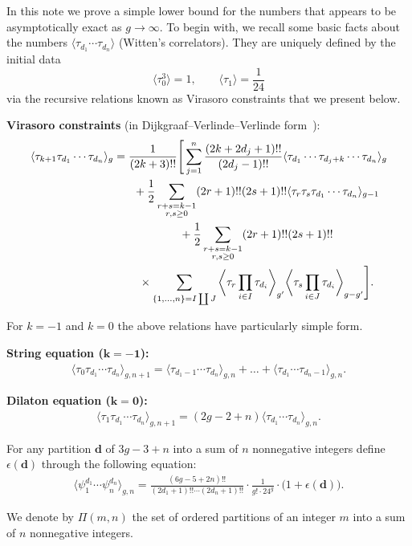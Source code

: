 In this note we prove a simple lower bound for the numbers
that appears to be asymptotically exact as $g\to\infty$. To
begin with, we recall some basic facts about the numbers
$\langle\tau_{d_1}\cdots\tau_{d_n}\rangle$ (Witten's
correlators). They are uniquely defined by the initial data
\[
\big\langle \tau_0^3 \big\rangle = 1,\qquad
\langle \tau_{1} \rangle = \frac{1}{24}
\]
via the recursive relations known as Virasoro constraints that we present below.

\textbf{Virasoro constraints} (in Dijkgraaf--Verlinde--Verlinde form~\cite{Dij, DVV}):
\begin{gather}
\langle\tau_{k+1}\tau_{d_1}\cdots\tau_{d_n}\rangle_g=\frac{1}{(2k+3)!!}\Bigg[\sum_{j=1}^n
\frac{(2k+2d_j+1)!!}{(2d_j-1)!!}\langle\tau_{d_1}\cdots
\tau_{d_{j}+k}\cdots\tau_{d_n}\rangle_g\nonumber\\
\hphantom{\langle\tau_{k+1}\tau_{d_1}\cdots\tau_{d_n}\rangle_g=}{} +\frac{1}{2}\sum_{\substack{r+s=k-1\\r,s\ge 0}}
(2r+1)!!(2s+1)!!\langle\tau_r\tau_s\tau_{d_1}\cdots\tau_{d_n}\rangle_{g-1}\nonumber\\
\hphantom{\langle\tau_{k+1}\tau_{d_1}\cdots\tau_{d_n}\rangle_g=}{} +\frac{1}{2}\sum_{\substack{r+s=k-1\\r,s\ge 0}} (2r+1)!!(2s+1)!!\nonumber\\
\hphantom{\langle\tau_{k+1}\tau_{d_1}\cdots\tau_{d_n}\rangle_g=}{}\times
\sum_{\{1,\dots,n\}=I\coprod J}\bigg\langle\tau_r\prod_{i\in
I}\tau_{d_i}\bigg\rangle_{g'}\bigg\langle\tau_s\prod_{i\in
J}\tau_{d_i}\bigg\rangle_{g-g'}\Bigg].\label{eq:virasoro}
\end{gather}

For $k=-1$ and $k=0$ the above relations have particularly simple form.

\textbf{String equation ($\boldsymbol{k=-1}$):}
\begin{gather}\label{eq:string}
\langle \tau_0\tau_{d_1} \cdots \tau_{d_n}\rangle_{g,n+1}
=\langle \tau_{d_1-1} \cdots \tau_{d_n}\rangle_{g,n}
+\dots
+\langle \tau_{d_1} \cdots \tau_{d_n-1}\rangle_{g,n} .
\end{gather}

\textbf{Dilaton equation ($\boldsymbol{k=0}$):}
\begin{gather*}%
\langle \tau_1\tau_{d_1} \cdots \tau_{d_n}\rangle_{g,n+1}
=(2g-2+n)\langle \tau_{d_1} \cdots \tau_{d_n}\rangle_{g,n} .
\end{gather*}

For any partition $\boldsymbol{d}$ of $3g-3+n$
into a sum of $n$ nonnegative integers define
$\epsilon(\boldsymbol{d})$ through the following equation:
\begin{gather*}%
\big\langle \psi_1^{d_1} \cdots \psi_n^{d_n}\big\rangle_{g,n}
=
\frac{(6g-5+2n)!!}{(2d_1+1)!!\cdots(2d_n+1)!!}
\cdot\frac{1}{g!\cdot 24^g} \cdot\big(1+\epsilon(\boldsymbol{d})\big) .
\end{gather*}

We denote by $\Pi(m,n)$ the
set of ordered partitions of an integer $m$ into a sum of $n$ nonnegative integers.
